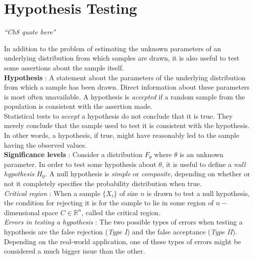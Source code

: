 \chapter{Hypothesis Testing}


\begin{flushright}
	\textit{``Ch8 quote here"} \\
\end{flushright}

In addition to the problem of estimating the unknown parameters of an underlying distribution from which samples are drawn, it is also useful to test some assertions about the sample itself. \\

\textbf{Hypothesis} : A statement about the parameters of the underlying distribution from which a sample has been drawn. Direct information about these parameters is most often unavailable. A hypothesis is \textit{accepted} if a random sample from the population is consistent with the assertion made. \\

Statistical tests to \textit{accept} a hypothesis do not conclude that it is true. They merely conclude that the sample used to test it is consistent with the hypothesis. In other words, a hypothesis, if true, might have reasonably led to the sample having the observed values.\\


\textbf{Significance levels} : Consider a distribution $ F_\theta $ where $ \theta $ is an unknown parameter. In order to test some hypothesis about $ \theta $, it is useful to define a \textit{null hypothesis} $ H_0 $. A null hypothesis is \textit{simple} or \textit{composite}, depending on whether or not it completely specifies the probability distribution when true.\\

\textit{Critical region} : When a sample $ \{X_i\} $ of size $ n $ is drawn to test a null hypothesis, the condition for rejecting it is for the sample to lie in some region of $ n -$dimensional space $ C \in \mathbb{R}^n $, called the critical region.\\

\textit{Errors in testing a hypothesis} : The two possible types of errors when testing a hypothesis are the false rejection (\textit{Type I}) and the false acceptance (\textit{Type II}). Depending on the real-world application, one of these types of errors might be considered a much bigger issue than the other.\\

